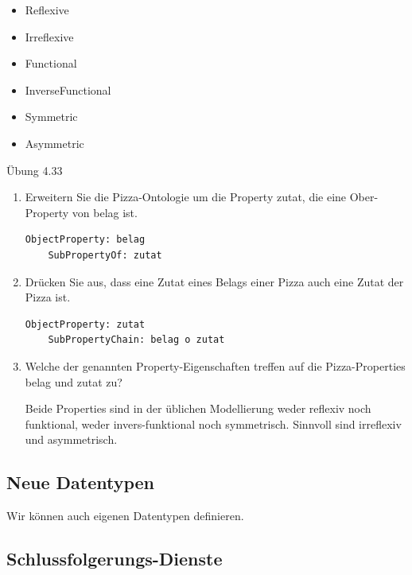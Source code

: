 \documentclass[a4paper]{article}
\begin{document}
\begin{itemize}
    \item Reflexive
    \item Irreflexive
    \item Functional
    \item InverseFunctional
    \item Symmetric
    \item Asymmetric
\end{itemize}

Übung 4.33

\begin{enumerate}
    \item Erweitern Sie die Pizza-Ontologie um die Property zutat, die eine Ober-Property von belag ist.

\begin{lstlisting}
ObjectProperty: belag
    SubPropertyOf: zutat
\end{lstlisting}

    \item Drücken Sie aus, dass eine Zutat eines Belags einer Pizza auch eine Zutat der Pizza ist.

\begin{lstlisting}
ObjectProperty: zutat
    SubPropertyChain: belag o zutat
\end{lstlisting}

    \item Welche der genannten Property-Eigenschaften treffen auf die Pizza-Properties belag und zutat zu?

Beide Properties sind in der üblichen Modellierung weder reflexiv noch funktional, weder invers-funktional noch symmetrisch. Sinnvoll sind irreflexiv und asymmetrisch.
\end{enumerate}



\subsection{Neue Datentypen}

Wir können auch eigenen Datentypen definieren.

\subsection{Schlussfolgerungs-Dienste}

\end{document}
